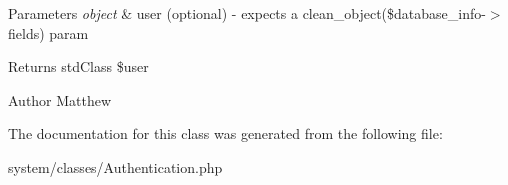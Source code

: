 \begin{DoxyParams}{Parameters}
{\em object} & user (optional) -\/ expects a clean\_\-object(\$database\_\-info-\/$>$fields) param\\
\hline
\end{DoxyParams}
\begin{DoxyReturn}{Returns}
stdClass \$user 
\end{DoxyReturn}
\begin{DoxyAuthor}{Author}
Matthew 
\end{DoxyAuthor}


The documentation for this class was generated from the following file:\begin{DoxyCompactItemize}
\item 
system/classes/Authentication.php\end{DoxyCompactItemize}
